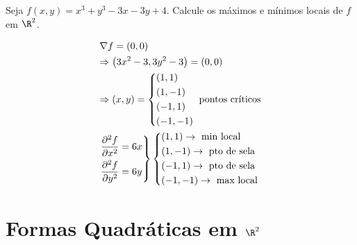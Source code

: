 \documentclass{book}
\begin{document}
\begin{ex}
    Seja $f\left( {x,y} \right) = x^3  + y^3  - 3x - 3y + 4$. Calcule os m\'aximos e m\'inimos locais de $f$ em $\R^2$.
\end{ex}

\begin{sol}
\[
\begin{gathered}
\nabla f = \left( {0,0} \right) \hfill \\
   \Rightarrow \left( {3x^2  - 3,3y^2  - 3} \right) = \left( {0,0} \right) \hfill \\
\Rightarrow \left( {x,y} \right) = \left\{ \begin{gathered}
\left( {1,1} \right) \hfill \\
\left( {1, - 1} \right) \hfill \\
\left( { - 1,1} \right) \hfill \\
\left( { - 1, - 1} \right) \hfill \\
\end{gathered}  \right.{\text{ pontos cr\'iticos}} \hfill \\
\left. \begin{gathered}
\frac{{\partial ^2 f}}
{{\partial x^2 }} = 6x \hfill \\
\frac{{\partial ^2 f}}
{{\partial y^2 }} = 6y \hfill \\
\end{gathered}  \right\}\left\{ \begin{gathered}
\left( {1,1} \right) \to {\text{ min local}} \hfill \\
\left( {1, - 1} \right) \to {\text{ pto de sela}} \hfill \\
\left( { - 1,1} \right) \to {\text{ pto de sela}} \hfill \\
\left( { - 1, - 1} \right) \to {\text{ max local}} \hfill \\
\end{gathered}  \right. \hfill \\
\end{gathered}
\]

\end{sol}

\section{Formas Quadr\'aticas em $\R^2$} \label{sec21}
\end{document}
